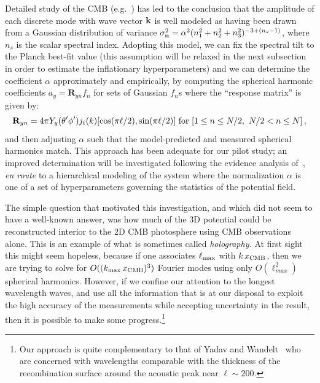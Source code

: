\documentclass[psfig,12pt]{article}
\def\ni{\noindent}
\begin{document}
{\ni{\bf Gaussian Prior:}
Detailed study of the CMB (e.g.~\cite{Aghanim:2015xee, Ade:2015ava}) has
led to the conclusion that the amplitude of each discrete mode with wave
vector $\bf k$ is well modeled as having been drawn from a Gaussian
distribution of variance $\sigma_{\bf
n}^2=\alpha^2(n_1^2+n_2^2+n_3^2)^{-3+(n_s-1)}$, where $n_s$ is the
scalar spectral index. Adopting this model, we can fix the spectral tilt
to the Planck best-fit value (this assumption will be relaxed in the
next subsection in order to estimate the inflationary hyperparameters)
and we can determine the coefficient $\alpha$ approximately and
empirically, by computing the spherical harmonic coefficients $a_y
=\mathbf{R}_{yn}f_n$ for sets of Gaussian $f_n$s where the ``response
matrix'' is given by:
\begin{equation}
\mathbf{R}_{yn}=4\pi Y_y(\theta'\phi')j_\ell(k)[\cos(\pi\ell/2),\sin(\pi\ell/2)]\ {\rm for}\ [1\le n\le N/2,\ N/2<n\le N]\, ,
\end{equation}
and then adjusting $\alpha$ such that the model-predicted and measured
spherical harmonics match. This approach has been adequate for our pilot
study; an improved determination will be investigated following the
evidence analysis of~\cite{Suyu2006}, {\sl en route} to a hierarchical
modeling of the system where the normalization $\alpha$ is one of a set
of hyperparameters governing the statistics of the potential field.

\ni{\bf Preliminary Results:}
The simple question that motivated this investigation, and which did not
seem to have a well-known answer, was how much of the 3D potential could
be reconstructed interior to the 2D CMB photosphere using CMB
observations alone. This is an example of what is sometimes called {\it
holography.} At first sight this might seem hopeless, because if one
associates $\ell_{\rm max}$ with $k\,x_{\rm CMB}$, then we are trying to
solve for $O((k_{\rm max}\,x_{\rm CMB})^3)$ Fourier modes using only
$O(\ell_{max}^2)$ spherical harmonics. However, if we confine our
attention to the longest wavelength waves, and
use all the information that is at our disposal to exploit the high
accuracy of the measurements while accepting uncertainty in the result,
then it is possible to make some progress.\footnote{Our approach is
quite complementary to that of Yadav and Wandelt~\cite{Yadav:2005} who
are concerned with wavelengths comparable with the thickness of the
recombination surface around the acoustic peak near $\ell\sim200$.}

}
\end{document}
